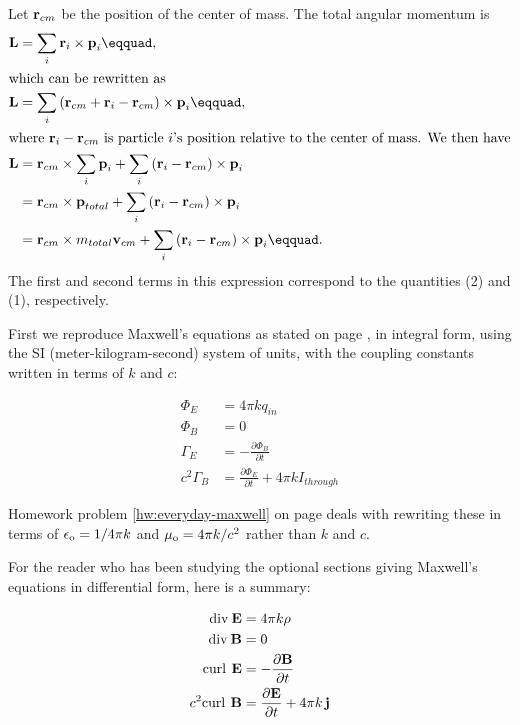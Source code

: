  Let $\textbf{r}_{cm}$ be the position of the center of mass.
The total angular momentum is
\begin{align*}
	\zb{L}	&= \sum_i \zb{r}_i \times \zb{p}_i\eqquad, \\
\intertext{which can be rewritten as}
	\zb{L}	&= \sum_i \left(\zb{r}_{cm} + \zb{r}_i -\zb{r}_{cm}\right) \times \zb{p}_i\eqquad,\\
\intertext{where $\zb{r}_i -\zb{r}_{cm}$ is particle $i$'s position relative to the center of mass. We then have}
	\zb{L}	&= \zb{r}_{cm} \times \sum_i \zb{p}_i
				+ \sum_i \left(\zb{r}_i -\zb{r}_{cm}\right) \times \zb{p}_i  \\
			&= \zb{r}_{cm} \times \zb{p}_{total}
				+ \sum_i \left(\zb{r}_i -\zb{r}_{cm}\right) \times \zb{p}_i \\
			&= \zb{r}_{cm} \times m_{total}\zb{v}_{cm}
				+ \sum_i \left(\zb{r}_i -\zb{r}_{cm}\right) \times \zb{p}_i\eqquad.
\end{align*}
The first and second terms in this expression correspond to the quantities
(2) and (1), respectively.


\noindent{}\label{maxwell-forms}

First we reproduce Maxwell's equations as stated on page \pageref{sec:maxwell}, in integral form, using the SI (meter-kilogram-second)
system of units, with the coupling constants written in terms of $k$ and $c$:

	\begin{align*}
		\Phi_E		&= 4\pi kq_{in} \\
		\Phi_B		&= 0 \\
		\Gamma_E 	&= -\frac{\partial\Phi_B}{\partial t} \\
		c^2\Gamma_B 	&= \frac{\partial\Phi_E}{\partial t}  + 4\pi k I_{through}
	\end{align*}

\noindent Homework problem \ref{hw:everyday-maxwell} on page \pageref{hw:everyday-maxwell} deals with rewriting these in terms of $\epsilon_{\textup{o}}=1/4\pi k$
and $\mu_{\textup{o}}=4\pi k/c^2$ rather than $k$ and $c$.

For the reader who has been studying the optional sections giving Maxwell's equations in \pagebreak[4]
differential form,
here is a summary:

	\begin{align*}
             \textup{div}\: \mathbf{E} &= 4\pi k \rho \\
             \textup{div}\: \mathbf{B} &= 0 \\
             \textup{curl}\:\,\mathbf{E} &= -\frac{\partial\mathbf{B}}{\partial t} \\
             c^2 \textup{curl}\:\,\mathbf{B} &= \frac{\partial\mathbf{E}}{\partial t} + 4\pi k \,\mathbf{j} 
	\end{align*}

